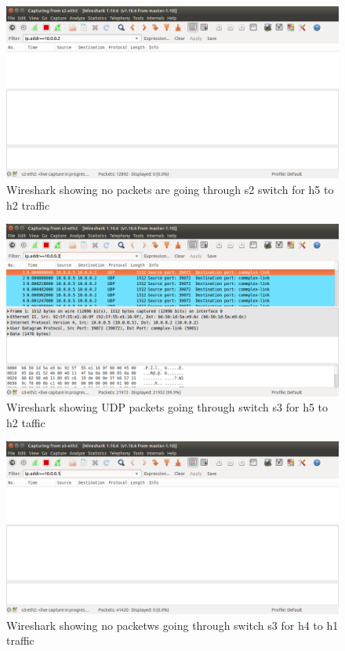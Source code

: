\begin{figure}[h!]
 \centering
 \includegraphics[width=\linewidth]{images/loadbalancing/s2fromh2.png}
 \caption{Wireshark showing no packets are going through s2 switch for h5 to h2 traffic}
 \label{fig:s2fromh2}
\end{figure}

\begin{figure}[h!]
 \centering
 \includegraphics[width=\linewidth]{images/loadbalancing/s3fromh2.png}
 \caption{Wireshark showing UDP packets going through switch s3 for h5 to h2 taffic}
 \label{fig:s3fromh2}
\end{figure}

\begin{figure}[h!]
 \centering
 \includegraphics[width=\linewidth]{images/loadbalancing/s3fromh1.png}
 \caption{Wireshark showing no packetws going through switch s3 for h4 to h1 traffic}
 \label{fig:s3fromh1}
\end{figure}